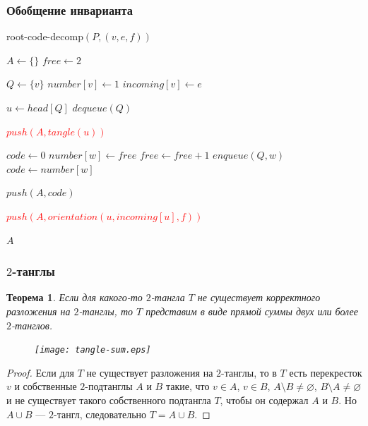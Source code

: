 \documentclass[dvips, intlimits, 9pt, unicode, notheorems]{beamer}
\theoremstyle{plain}
\newtheorem{theorem}{Теорема}
\theoremstyle{definition}
\begin{document}
	\begin{frame}
		\frametitle{Обобщение инварианта}

		\begin{block}{root-code-decomp$(P, (v, e, f))$}
		{
			\footnotesize
			\begin{algorithmic}[H]
				\STATE $A \leftarrow \{\}$
				\STATE $free \leftarrow 2$

				\STATE $Q \leftarrow \{v\}$
				\STATE $number[v] \leftarrow 1$
				\STATE $incoming[v] \leftarrow e$

					\STATE $u \leftarrow head[Q]$
					\STATE $dequeue(Q)$

					\STATE \textcolor{red}{$push(A, tangle(u))$}

							\STATE $code \leftarrow 0$
						\ELSE
								\STATE $number[w] \leftarrow free$
								\STATE $free \leftarrow free + 1$
								\STATE $enqueue(Q, w)$
							\ENDIF
							\STATE $code \leftarrow number[w]$
						\ENDIF

						\STATE $push(A, code)$
					\ENDFOR

					\STATE \textcolor{red}{$push(A, orientation(u, incoming[u], f))$}
				\ENDWHILE

				\RETURN $A$
			\end{algorithmic}
		}
		\end{block}
	\end{frame}

	\begin{frame}
		\frametitle{$2$-танглы}

		\begin{theorem}
			Если для какого-то $2$-тангла $T$ не существует корректного разложения на $2$-танглы, то $T$ представим в виде прямой
			суммы двух или более $2$-танглов.
			\begin{figure}[H]
				\centering
				\texttt{[image: tangle-sum.eps]}
			\end{figure}
		\end{theorem}
		\begin{proof}
			Если для $T$ не существует разложения на $2$-танглы, то в $T$ есть перекресток $v$ и собственные $2$-подтанглы $A$ и $B$
			такие, что $v \in A$, $v \in B$, $A\setminus B\neq\varnothing$, $B\setminus A\neq\varnothing$ и не существует такого
			собственного подтангла $T$, чтобы он содержал $A$ и $B$. Но $A \cup B$ --- $2$-тангл, следовательно $T = A \cup B$.
		\end{proof}
	\end{frame}
\end{document}
